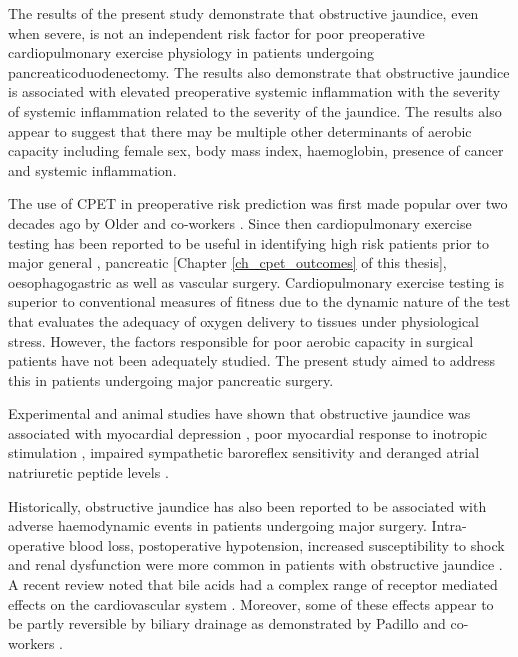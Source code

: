 The results of the present study demonstrate that obstructive jaundice, even when severe, is not an independent risk factor for poor preoperative cardiopulmonary exercise physiology in patients undergoing pancreaticoduodenectomy. 
The results also demonstrate that obstructive jaundice is associated with elevated preoperative systemic inflammation with the severity of systemic inflammation related to the severity of the jaundice.
The results also appear to suggest that there may be multiple other determinants of aerobic capacity including female sex, body mass index, haemoglobin, presence of cancer and systemic inflammation.

The use of CPET in preoperative risk prediction was first made popular over two decades ago by Older and co-workers \parencite{older_preoperative_1993}. 
Since then cardiopulmonary exercise testing has been reported to be useful in identifying high risk patients prior to major general \parencite{snowden_submaximal_2010}, pancreatic \parencite{ausania_effects_2012}[Chapter \ref{ch_cpet_outcomes} of this thesis], oesophagogastric \parencite{nagamatsu_preoperative_2001} as well as vascular \parencite{carlisle_mid-term_2007} surgery. 
Cardiopulmonary exercise testing is superior to conventional measures of fitness due to the dynamic nature of the test that evaluates the adequacy of oxygen delivery to tissues under physiological stress. 
However, the factors responsible for poor aerobic capacity in surgical patients have not been adequately studied. 
The present study aimed to address this in patients undergoing major pancreatic surgery.

Experimental and animal studies have shown that obstructive jaundice was associated with myocardial depression \parencite{green_jaundiced_1986}, poor myocardial response to inotropic stimulation \parencite{lumlertgul_jaundiced_1991}, impaired sympathetic baroreflex sensitivity \parencite{song_baroreflex_2009} and deranged atrial natriuretic peptide levels \parencite{pereira_increased_1994,gallardo_increased_1998}. 

Historically, obstructive jaundice has also been reported to be associated with adverse haemodynamic events in patients undergoing major surgery. 
Intra-operative blood loss, postoperative hypotension, increased susceptibility to shock and renal dysfunction were more common in patients with obstructive jaundice \parencite{dixon_factors_1983, pain_perioperative_1985, green_systemic_1995}.
A recent review noted that bile acids had a complex range of receptor mediated effects on the cardiovascular system \parencite{khurana_bile_2011}. 
Moreover, some of these effects appear to be partly reversible by biliary drainage as demonstrated by Padillo and co-workers \parencite{padillo_improved_2001}.

